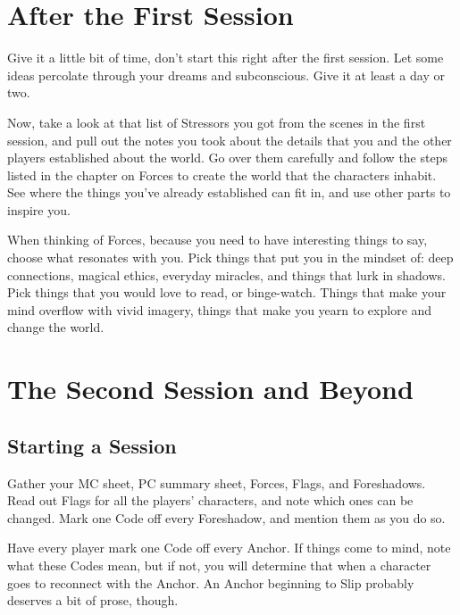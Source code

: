 \documentclass[
]{memoir}
\begin{document}
\hypertarget{after-the-first-session}{%
\section{After the First Session}\label{after-the-first-session}}

Give it a little bit of time, don't start this right after the first
session. Let some ideas percolate through your dreams and subconscious.
Give it at least a day or two.

Now, take a look at that list of Stressors you got from the scenes in
the first session, and pull out the notes you took about the details
that you and the other players established about the world. Go over them
carefully and follow the steps listed in the chapter on Forces to create
the world that the characters inhabit. See where the things you've
already established can fit in, and use other parts to inspire you.

When thinking of Forces, because you need to have interesting things to
say, choose what resonates with you. Pick things that put you in the
mindset of: deep connections, magical ethics, everyday miracles, and
things that lurk in shadows. Pick things that you would love to read, or
binge-watch. Things that make your mind overflow with vivid imagery,
things that make you yearn to explore and change the world.

\hypertarget{the-second-session-and-beyond}{%
\section{The Second Session and
Beyond}\label{the-second-session-and-beyond}}

\hypertarget{starting-a-session-1}{%
\subsection{Starting a Session}\label{starting-a-session-1}}

Gather your MC sheet, PC summary sheet, Forces, Flags, and Foreshadows.
Read out Flags for all the players' characters, and note which ones can
be changed. Mark one Code off every Foreshadow, and mention them as you
do so.

Have every player mark one Code off every Anchor. If things come to
mind, note what these Codes mean, but if not, you will determine that
when a character goes to reconnect with the Anchor. An Anchor beginning
to Slip probably deserves a bit of prose, though.
\end{document}
